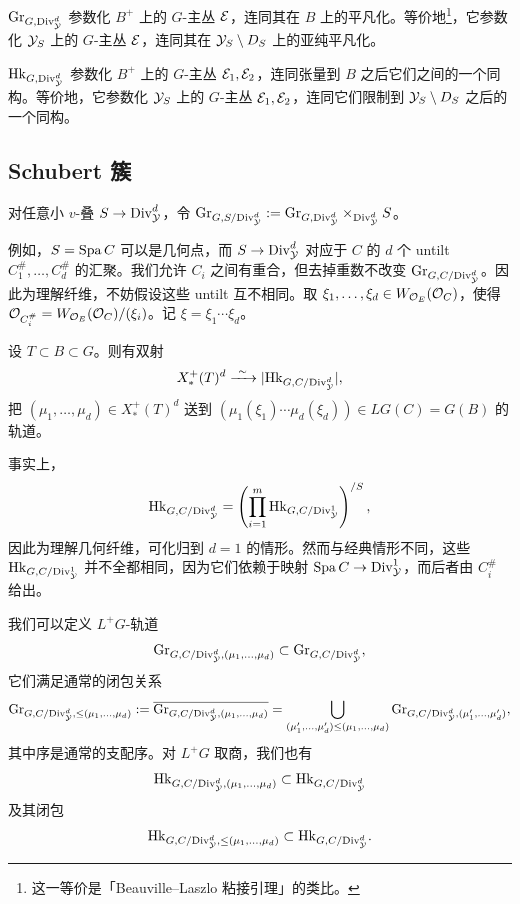 \begin{proposition}
$\mathrm{Gr}_{G,\mathrm{Div}^d_{\mathcal{Y}}}$ 参数化 $B^+$ 上的 $G$-主丛 $\mathcal{E}$，连同其在 $B$ 上的平凡化。等价地\footnote{这一等价是「Beauville--Laszlo 粘接引理」的类比。}，它参数化 $\mathcal{Y}_S$ 上的 $G$-主丛 $\mathcal{E}$，连同其在 $\mathcal{Y}_S\setminus D_S$ 上的亚纯平凡化。

$\mathrm{Hk}_{G,\mathrm{Div}^d_{\mathcal{Y}}}$ 参数化 $B^+$ 上的 $G$-主丛 $\mathcal{E}_1,\mathcal{E}_2$，连同张量到 $B$ 之后它们之间的一个同构。等价地，它参数化 $\mathcal{Y}_S$ 上的 $G$-主丛 $\mathcal{E}_1,\mathcal{E}_2$，连同它们限制到 $\mathcal{Y}_S\setminus D_S$ 之后的一个同构。
\end{proposition}


\subsection{Schubert 簇}

对任意小 $v$-叠 $S\to\mathrm{Div}^d_{\mathcal{Y}}$，令 $\mathrm{Gr}_{G,S/\mathrm{Div}^d_{\mathcal{Y}}}:=\mathrm{Gr}_{G,\mathrm{Div}^d_{\mathcal{Y}}}\times_{\mathrm{Div}^d_{\mathcal{Y}}}S$。

例如，$S=\operatorname{Spa} C$ 可以是几何点，而 $S\to\mathrm{Div}^d_{\mathcal{Y}}$ 对应于 $C$ 的 $d$ 个 untilt $C^{\#}_1,\ldots,C^{\#}_d$ 的汇聚。我们允许 $C_i$ 之间有重合，但去掉重数不改变 $\mathrm{Gr}_{G,C/\mathrm{Div}^d_{\mathcal{Y}}}$。因此为理解纤维，不妨假设这些 untilt 互不相同。取 $\xi_1,\ldots,\xi_d\in W_{\mathcal{O}_E}(\mathcal{O}_C)$，使得 $\mathcal{O}_{C^{\#}_i}=W_{\mathcal{O}_E}(\mathcal{O}_C)/(\xi_i)$。记 $\xi=\xi_1\cdots\xi_d$。

\begin{proposition}
设 $T\subset B\subset G$。则有双射
\[
X^+_*(T)^d\xrightarrow{\ \sim\ }|\mathrm{Hk}_{G,C/\Div^d_{\cY}}|,
\]
把 $(\mu_1,\ldots,\mu_d)\in X^+_*(T)^d$ 送到 $(\mu_1(\xi_1)\cdots\mu_d(\xi_d))\in LG(C)=G(B)$ 的轨道。
\end{proposition}

\begin{remark}
事实上，
\[
\mathrm{Hk}_{G,C/\mathrm{Div}^d_{\mathcal{Y}}}=\left(\prod_{i=1}^m\mathrm{Hk}_{G,C/\mathrm{Div}^1_{\mathcal{Y}}}\right)^{/S},
\]
因此为理解几何纤维，可化归到 $d=1$ 的情形。然而与经典情形不同，这些 $\mathrm{Hk}_{G,C/\mathrm{Div}^1_{\mathcal{Y}}}$ 并不全都相同，因为它们依赖于映射 $\operatorname{Spa} C\to\mathrm{Div}^1_{\mathcal{Y}}$，而后者由 $C^{\#}_i$ 给出。
\end{remark}

我们可以定义 $L^+G$-轨道
\[
\mathrm{Gr}_{G,C/\mathrm{Div}^d_{\mathcal{Y}},(\mu_1,\ldots,\mu_d)}\subset\mathrm{Gr}_{G,C/\mathrm{Div}^d_{\mathcal{Y}}},
\]
它们满足通常的闭包关系
\[
\mathrm{Gr}_{G,C/\mathrm{Div}^d_{\mathcal{Y}},\le(\mu_1,\ldots,\mu_d)}:=\overline{\mathrm{Gr}_{G,C/\mathrm{Div}^d_{\mathcal{Y}},(\mu_1,\ldots,\mu_d)}}=\bigcup_{(\mu'_1,\ldots,\mu'_d)\le(\mu_1,\ldots,\mu_d)}\mathrm{Gr}_{G,C/\mathrm{Div}^d_{\mathcal{Y}},(\mu'_1,\ldots,\mu'_d)},
\]
其中序是通常的支配序。对 $L^+G$ 取商，我们也有
\[
\mathrm{Hk}_{G,C/\mathrm{Div}^d_{\mathcal{Y}},(\mu_1,\ldots,\mu_d)}\subset\mathrm{Hk}_{G,C/\mathrm{Div}^d_{\mathcal{Y}}}
\]
及其闭包
\[
\mathrm{Hk}_{G,C/\mathrm{Div}^d_{\mathcal{Y}},\le(\mu_1,\ldots,\mu_d)}\subset\mathrm{Hk}_{G,C/\mathrm{Div}^d_{\mathcal{Y}}}.
\]

